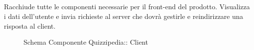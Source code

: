 \subsection{}
Racchiude tutte le componenti necessarie per il front-end del prodotto. Visualizza i dati dell'utente e invia richieste al server che dovrà gestirle e reindirizzare una risposta al client.
\begin{figure}[H]
\centering
\noindent{}
\caption[Schema Componente Client]{Schema Componente Quizzipedia:: Client}
\end{figure}
